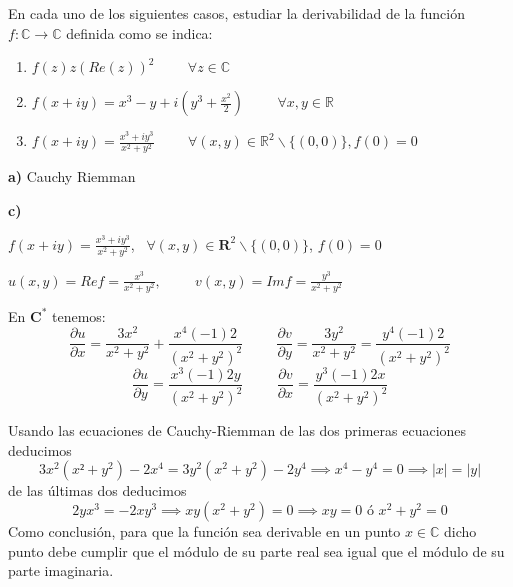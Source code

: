 \begin{ejer}
	En cada uno de los siguientes casos, estudiar la derivabilidad de la función $f:\mathbb{C} \rightarrow\mathbb{C}$ definida como se indica:
	\begin{enumerate}[label=(\alph*)]
		\item $f(z)  z(Re(z))^2 \hspace{1cm}\forall z\in\mathbb{C}$
		\item $f(x+iy) = x^3 -y+i\left( y^3 +\frac{x^2}{2} \right) \hspace{1cm} \forall x,y\in\mathbb{R}$
		\item $f(x+iy) = \frac{x^3+iy^3}{x^2+y^2} \hspace{1cm} \forall (x,y)\in\mathbb{R}^2\backslash\{(0,0)\}, f(0)=0$
	\end{enumerate}	
\end{ejer}
\begin{sol}

\textbf{a)}
Cauchy Riemman




\textbf{c)}

$f(x+iy) = \frac{x^3+iy^3}{x^2+y^2}$, \ $\forall (x,y)\in\mathbf{R}^2 \backslash \{ (0,0) \}$, $f(0)=0$

$u(x,y) = Re f = \frac{x^3}{x^2+y^2}, \hspace{1cm} v(x,y) = Imf = \frac{y^3}{x^2+y^2}$

En $\mathbf{C}^{\ast}$ tenemos:
$$ \frac{\partial u}{\partial x} = \frac{3x^2}{x^2+y^2} + \frac{x^4(-1)2}{(x^2+y^2)^2} \hspace{1cm}
\frac{\partial v}{\partial y} = \frac{3y^2}{x^2+y^2} = \frac{y^4(-1)2}{(x^2+y^2)^2}$$
$$ \frac{\partial u}{\partial y} = \frac{x^3 (-1)2y}{(x^2+y^2)^2} \hspace{1cm}
\frac{\partial v}{\partial x} = \frac{y^3(-1)2x}{(x^2+y^2)^2}$$

Usando las ecuaciones de Cauchy-Riemman de las dos primeras ecuaciones deducimos
$$3x^2(x²+y^2) - 2x^4 = 3y^2(x^2+y^2)-2y^4 \implies x^4-y^4 = 0 \implies |x|=|y|$$
de las últimas dos deducimos
$$2yx^3=-2xy^3 \implies xy(x^2+y^2) = 0 \implies xy=0 \text{ ó } x^2+y^2=0$$
Como conclusión, para que la función sea derivable en un punto $x\in\mathbb{C}$ dicho punto debe cumplir que el módulo de su parte real sea igual que el módulo de su parte imaginaria.

\end{sol}




